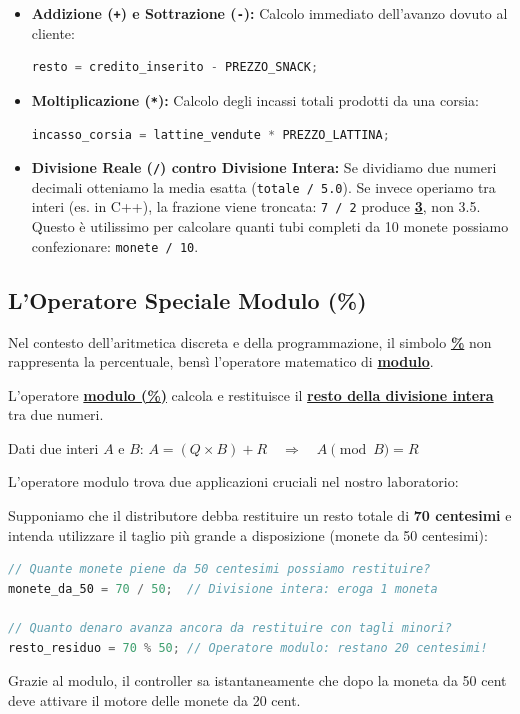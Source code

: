 \begin{itemize}
  \item \textbf{Addizione (\texttt{+}) e Sottrazione (\texttt{-}):} Calcolo immediato dell'avanzo dovuto al cliente:
  \begin{lstlisting}[language=C++]
resto = credito_inserito - PREZZO_SNACK;
  \end{lstlisting}
  \item \textbf{Moltiplicazione (\texttt{*}):} Calcolo degli incassi totali prodotti da una corsia:
  \begin{lstlisting}[language=C++]
incasso_corsia = lattine_vendute * PREZZO_LATTINA;
  \end{lstlisting}
  \item \textbf{Divisione Reale (\texttt{/}) contro Divisione Intera:} Se dividiamo due numeri decimali otteniamo la media esatta (\texttt{totale / 5.0}). Se invece operiamo tra interi (es. in C++), la frazione viene troncata: \texttt{7 / 2} produce \textbf{\underline{3}}, non 3.5. Questo è utilissimo per calcolare quanti tubi completi da 10 monete possiamo confezionare: \texttt{monete / 10}.
\end{itemize}

\subsection{L'Operatore Speciale Modulo (\%)}

Nel contesto dell'aritmetica discreta e della programmazione, il simbolo \textbf{\underline{\%}} non rappresenta la percentuale, bensì l'operatore matematico di \textbf{\underline{modulo}}.

\begin{concetto}
L'operatore \textbf{\underline{modulo (\%)}} calcola e restituisce il \textbf{\underline{resto della divisione intera}} tra due numeri.
\begin{center}
Dati due interi $A$ e $B$: \quad $A = (Q \times B) + R \quad \Longrightarrow \quad A \pmod B = R$
\end{center}
\end{concetto}

L'operatore modulo trova due applicazioni cruciali nel nostro laboratorio:

\begin{esempio}
Supponiamo che il distributore debba restituire un resto totale di \textbf{70 centesimi} e intenda utilizzare il taglio più grande a disposizione (monete da 50 centesimi):
\begin{lstlisting}[language=C++]
// Quante monete piene da 50 centesimi possiamo restituire?
monete_da_50 = 70 / 50;  // Divisione intera: eroga 1 moneta

// Quanto denaro avanza ancora da restituire con tagli minori?
resto_residuo = 70 % 50; // Operatore modulo: restano 20 centesimi!
\end{lstlisting}
Grazie al modulo, il controller sa istantaneamente che dopo la moneta da 50 cent deve attivare il motore delle monete da 20 cent.
\end{esempio}

